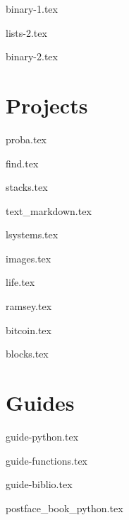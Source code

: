 \documentclass[10pt,twoside,openright]{report}
\begin{document}
{binary-1.tex}

{lists-2.tex}

{binary-2.tex}


\clearemptydoublepage


\part{Projects}

{proba.tex}

{find.tex}

{stacks.tex}

{text_markdown.tex}

{lsystems.tex}

{images.tex}

{life.tex}

{ramsey.tex}

{bitcoin.tex}

{blocks.tex}


\clearemptydoublepage

\part{Guides}

{guide-python.tex}

{guide-functions.tex}

{guide-biblio.tex} 



\clearemptydoublepage


{postface_book_python.tex}

\newpage

~
\vfill
\bigskip
\bigskip

\end{document}
